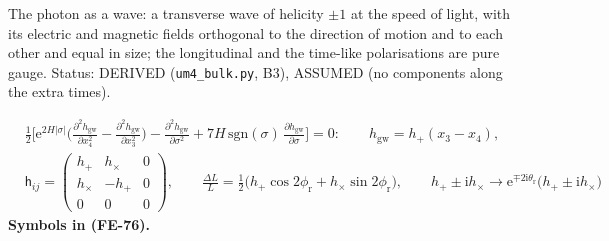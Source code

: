 \documentclass[
  10pt,
]{article}
\begin{document}
The photon as a wave: a transverse wave of helicity \(\pm1\) at the
speed of light, with its electric and magnetic fields orthogonal to the
direction of motion and to each other and equal in size; the
longitudinal and the time-like polarisations are pure gauge. Status:
DERIVED (\texttt{um4\_bulk.py}, B3), ASSUMED (no components along the
extra times).

\[
\begin{aligned}
&\frac12\Big[\mathrm{e}^{2H\lvert\sigma\rvert}\Big(\frac{\partial^2h_{\mathrm{gw}}}{\partial x_4^2} - \frac{\partial^2h_{\mathrm{gw}}}{\partial x_3^2}\Big)
 - \frac{\partial^2h_{\mathrm{gw}}}{\partial\sigma^2} + 7H\,\mathrm{sgn}(\sigma)\,\frac{\partial h_{\mathrm{gw}}}{\partial\sigma}\Big] = 0:\qquad
 h_{\mathrm{gw}} = h_{+}(x_3 - x_4),\\
&\mathsf{h}_{ij} = \begin{pmatrix} h_{+} & h_{\times} & 0\\ h_{\times} & -h_{+} & 0\\ 0 & 0 & 0\end{pmatrix},\qquad
 \frac{\Delta L}{L} = \frac12\big(h_{+}\cos2\phi_{\mathrm{r}} + h_{\times}\sin2\phi_{\mathrm{r}}\big),\qquad
 h_{+} \pm \mathrm{i}h_{\times} \to \mathrm{e}^{\mp2\mathrm{i}\theta_{\mathrm{r}}}\big(h_{+} \pm \mathrm{i}h_{\times}\big)
\end{aligned} \tag{FE-76}
\] \textbf{Symbols in (FE-76).}
\end{document}
